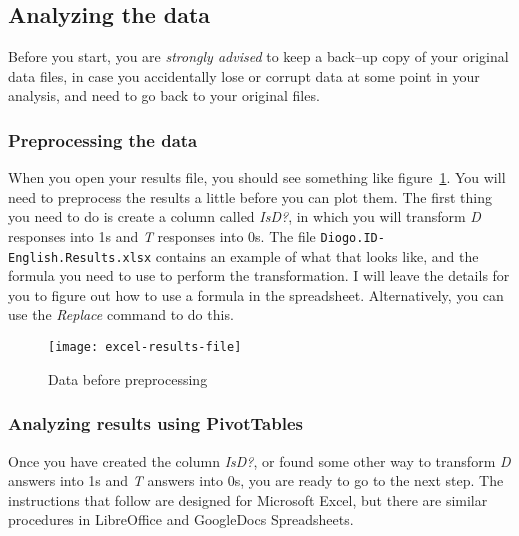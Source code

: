 \documentclass{article}
\newcommand{\soft}[1]{\textsf{#1}}
\newcommand{\filefmat}[1]{\texttt{#1}}
\newcommand{\MSExcel}{\soft{Microsoft\texttrademark{} Excel}}
\newcommand{\OpOff}{\soft{LibreOffice}}
\newcommand{\GDocs}{\soft{GoogleDocs Spreadsheets}}
\begin{document}

\subsection{Analyzing the data}

Before you start, you are \emph{strongly advised} to keep a back--up copy of your original data files, in case you accidentally lose or corrupt data at some point in your analysis, and need to go back to your original files.

\subsubsection{Preprocessing the data}

When you open your results file, you should see something like figure~\ref{excel-results-file}. You will need to preprocess the results a little before you can plot them. The first thing you need to do is create a column called \emph{IsD?}, in which you will transform \emph{D} responses into 1s and \emph{T} responses into 0s. The file \filefmat{Diogo.ID-English.Results.xlsx} contains an example of what that looks like, and the formula you need to use to perform the transformation. I will leave the details for you to figure out how to use a formula in the spreadsheet. Alternatively, you can use the \emph{Replace} command to do this.

\begin{figure}[!tbp]
\caption{Data before preprocessing}
\label{excel-results-file}
	\begin{center}
		\texttt{[image: excel-results-file]}
	\end{center}
\end{figure}

\subsubsection{Analyzing results using PivotTables}

Once you have created the column \emph{IsD?}, or found some other way to transform \emph{D} answers into 1s and \emph{T} answers into 0s, you are ready to go to the next step. The instructions that follow are designed for \MSExcel{}, but there are similar procedures in \OpOff{} and \GDocs{}.
\end{document}
